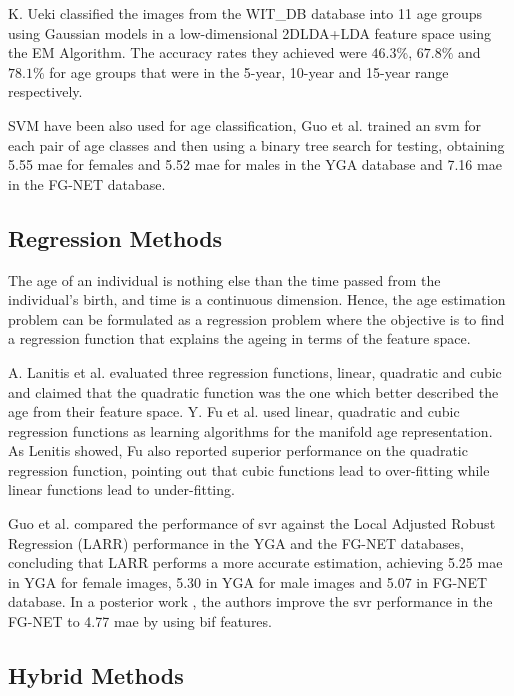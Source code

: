K. Ueki \cite{Ueki:2006:SAC:1126250.1126269} classified the images from the WIT\_DB database into 11 age groups using Gaussian models in a low-dimensional 2DLDA+LDA feature space using the EM Algorithm. The accuracy rates they achieved were $46.3\%$, $67.8\%$ and $78.1\%$ for age groups that were in the 5-year, 10-year and 15-year range respectively.

SVM have been also used for age classification, Guo et al. \cite{4544009} \cite{Guo:2008:IHA:2319085.2321608} trained an \gls{svm} for each pair of age classes and then using a binary tree search for testing, obtaining 5.55 \gls{mae} for females and 5.52 \gls{mae} for males in the YGA database and 7.16 \gls{mae} in the FG-NET database. 


\subsection{Regression Methods}

The age of an individual is nothing else than the time passed from the individual's birth, and time is a continuous dimension. Hence, the age estimation problem can be formulated as a regression problem where the objective is to find a regression function that explains the ageing in terms of the feature space.

A. Lanitis et al. \cite{Lanitis:2004:CDC:2225304.2226166} evaluated three regression functions, linear, quadratic and cubic and claimed that the quadratic function was the one which better described the age from their feature space. Y. Fu et al. \cite{4523958} \cite{4284917} used linear, quadratic and cubic regression functions as learning algorithms for the manifold age representation. As Lenitis showed, Fu also reported superior performance on the quadratic regression function, pointing out that cubic functions lead to over-fitting while linear functions lead to under-fitting.

Guo et al. \cite{4544009} \cite{Guo:2008:IHA:2319085.2321608} compared the performance of \gls{svr} against the Local Adjusted Robust Regression (LARR) performance in the YGA and the FG-NET databases, concluding that LARR performs a more accurate estimation, achieving 5.25 \gls{mae} in YGA for female images, 5.30 in YGA for male images and  5.07 in FG-NET database. In a posterior work \cite{conf/cvpr/GuoMFH09}, the authors improve the \gls{svr} performance in the FG-NET to 4.77 \gls{mae} by using \gls{bif} features.

\subsection{Hybrid Methods}

